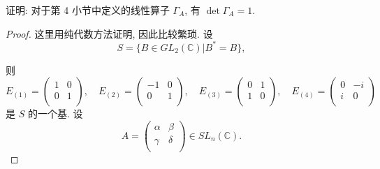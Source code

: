 \documentclass[color=black,device=normal,lang=cn,mode=geye]{elegantnote}
\begin{document}
\begin{exercise}%
    证明: 对于第 4 小节中定义的线性算子 $\Gamma_A$, 有 $\det\Gamma_A=1$.
\end{exercise}
\begin{landscape}
    \begin{proof}
        这里用纯代数方法证明, 因此比较繁琐. 设
        \[S=\{B\in GL _2(\mathbb{C})|B^*=B\},\]
        
        则
        \[E_{(1)}=\begin{pmatrix}
            1 & 0 \\
            0 & 1 \\
        \end{pmatrix},\quad E_{(2)}=\begin{pmatrix}
            -1 & 0 \\
            0 & 1 \\
        \end{pmatrix},\quad E_{(3)}=\begin{pmatrix}
            0 & 1 \\
            1 & 0 \\
        \end{pmatrix},\quad E_{(4)}=\begin{pmatrix}
            0 & -i \\
            i & 0 \\
        \end{pmatrix}\]
        是 $S$ 的一个基. 设
        \[A=\begin{pmatrix}
            \alpha & \beta \\
            \gamma & \delta \\
        \end{pmatrix}\in SL _n(\mathbb{C}).\]
    

\end{proof}
\end{landscape}
\end{document}
